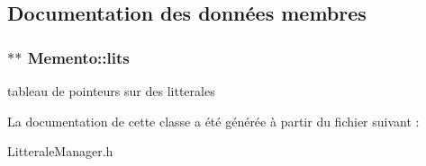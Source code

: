 \subsection{Documentation des données membres}
\hypertarget{class_memento_0294c5bd7e564cd5614911979e65b35d}{
\subsubsection[{lits}]{$\ast$$\ast$ {\bf Memento::lits}}}
\label{class_memento_0294c5bd7e564cd5614911979e65b35d}


tableau de pointeurs sur des litterales 

La documentation de cette classe a été générée à partir du fichier suivant :\begin{CompactItemize}
\item 
LitteraleManager.h\end{CompactItemize}
